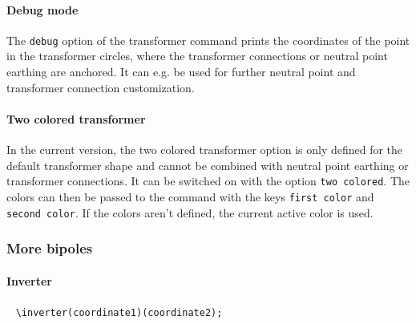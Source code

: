 \documentclass[a4]{article}
\begin{document}
\paragraph{Debug mode}
The \verb+debug+ option of the transformer command prints the coordinates of the point in the transformer circles, where the transformer connections or neutral point earthing are anchored. It can e.g. be used for further neutral point and transformer connection customization.
\begin{examplebox}
\end{examplebox}
\paragraph{Two colored transformer } In the current version, the two colored transformer option is only defined for the default transformer shape and cannot be combined with neutral point earthing or transformer connections. It can be switched on with the option \verb+two colored+. The colors can then be passed to the command with the keys \verb+first color+ and \verb+second color+. If the colors aren't defined, the current active color is used.
\begin{examplebox}
\end{examplebox}
\subsubsection{More bipoles}
\paragraph{Inverter} \ \color{myblue}
\verb+\inverter(coordinate1)(coordinate2);+\color{black}
\begin{examplebox}
\end{examplebox}
\end{document}
